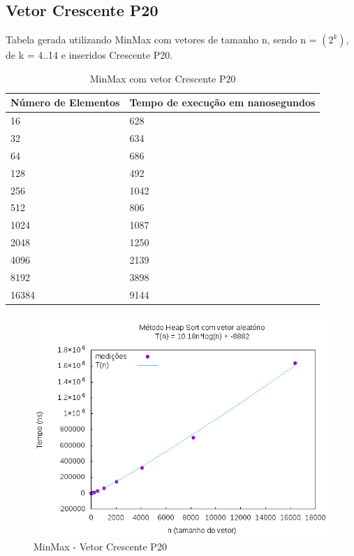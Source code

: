 \documentclass[12pt,a4paper,twoside]{report}
\begin{document}
\subsection{Vetor Crescente P20}
Tabela gerada utilizando MinMax com vetores de tamanho n, sendo n = $(2^k)$, de k = 4..14 e inseridos Crescente P20.
\begin{table}[H]
\centering
\caption{MinMax com vetor Crescente P20}
\label{my-label}
\begin{tabular}{|l|l|}
\hline
\multicolumn{1}{|c|}{\textbf{Número de Elementos}} & \multicolumn{1}{c|}{\textbf{Tempo de execução em nanosegundos}} \\ \hline
16 & 628 \\ \hline
32 & 634 \\ \hline
64 & 686 \\ \hline
128 & 492 \\ \hline
256 & 1042 \\ \hline
512 & 806 \\ \hline
1024 & 1087 \\ \hline
2048 & 1250 \\ \hline
4096 & 2139 \\ \hline
8192 & 3898 \\ \hline
16384 & 9144 \\ \hline
\end{tabular}
\end{table}

\begin{figure}[H]
    \centering
    \includegraphics[width=0.7\linewidth]{graficos/HeapSort/vIntAleatorio/vIntAleatorio.png}
  \caption{MinMax - Vetor Crescente P20}
\end{figure}
\end{document}
